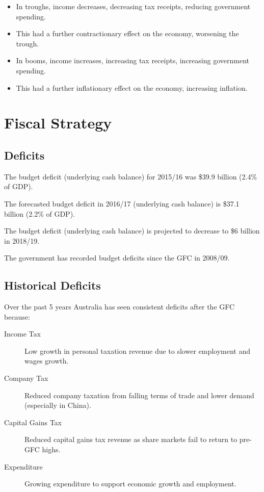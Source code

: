 \documentclass[a4paper,11pt]{report}
\begin{document}
\begin{itemize}
\item In troughs, income decreases, decreasing tax receipts, reducing government
	spending.
\item This had a further contractionary effect on the economy, worsening the
	trough.
\item In booms, income increases, increasing tax receipts, increasing government
	spending.
\item This had a further inflationary effect on the economy, increasing
	inflation.
\end{itemize}


\section{Fiscal Strategy}

\subsection{Deficits}

The budget deficit (underlying cash balance) for 2015/16 was \$39.9 billion
(2.4\% of GDP).

The forecasted budget deficit in 2016/17 (underlying cash balance) is \$37.1
billion (2.2\% of GDP).

The budget deficit (underlying cash balance) is projected to decrease to \$6
billion in 2018/19.

The government has recorded budget deficits since the GFC in 2008/09.

\subsection{Historical Deficits}

Over the past 5 years Australia has seen consistent deficits after the GFC
because:

\begin{description}
\item [Income Tax] Low growth in personal taxation revenue due to slower
	employment and wages growth.
\item [Company Tax] Reduced company taxation from falling terms of trade and
	lower demand (especially in China).
\item [Capital Gains Tax] Reduced capital gains tax revenue as share markets
	fail to return to pre-GFC highs.
\item [Expenditure] Growing expenditure to support economic growth and employment.
\end{description}
\end{document}
